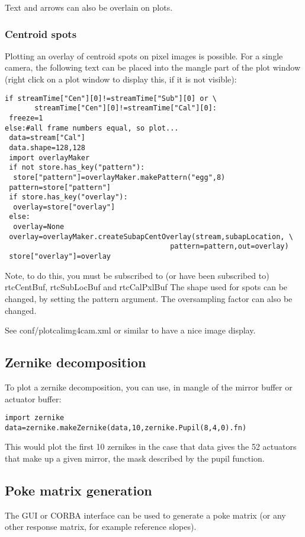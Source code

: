 \documentclass[a4,10pt]{article}
\begin{document}
Text and arrows can also be overlain on plots.

\subsubsection{Centroid spots}
Plotting an overlay of centroid spots on pixel images is possible.
For a single camera, the following text can be placed into the mangle
part of the plot window (right click on a plot window to display this,
if it is not visible):
\begin{verbatim}
if streamTime["Cen"][0]!=streamTime["Sub"][0] or \
       streamTime["Cen"][0]!=streamTime["Cal"][0]:
 freeze=1
else:#all frame numbers equal, so plot...
 data=stream["Cal"]
 data.shape=128,128
 import overlayMaker
 if not store.has_key("pattern"):
  store["pattern"]=overlayMaker.makePattern("egg",8)
 pattern=store["pattern"]
 if store.has_key("overlay"):
  overlay=store["overlay"]
 else:
  overlay=None
 overlay=overlayMaker.createSubapCentOverlay(stream,subapLocation, \
                                       pattern=pattern,out=overlay)
 store["overlay"]=overlay
\end{verbatim}

Note, to do this, you must be subscribed to (or have been subscribed
to) rtcCentBuf, rtcSubLocBuf and rtcCalPxlBuf
The shape used for spots can be changed, by setting the pattern
argument.  The oversampling factor can also be changed.

See conf/plotcalimg4cam.xml or similar to have a nice image display.

\subsection{Zernike decomposition}
To plot a zernike decomposition, you can use, in mangle of the mirror
buffer or actuator buffer:
\begin{verbatim}
import zernike
data=zernike.makeZernike(data,10,zernike.Pupil(8,4,0).fn)
\end{verbatim}
This would plot the first 10 zernikes in the case that data
gives the 52 actuators that make up a given mirror, the mask described
by the pupil function.

\subsection{Poke matrix generation}
The GUI or CORBA interface can be used to generate a poke matrix (or
any other response matrix, for example reference slopes).
\end{document}
